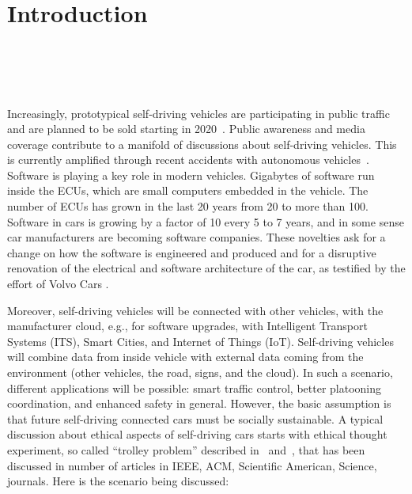 \section{Introduction}

\\
\\
\\
\\

Increasingly, prototypical self-driving vehicles are participating in public traffic~\cite{Persson2014} and are planned to be sold starting in 2020~\cite{Toyota2015,Stoll_WSJ_2016}. Public awareness and media coverage contribute to a manifold of discussions about self-driving vehicles. This is currently amplified through recent accidents with autonomous vehicles~\cite{Tesla2016_tragicloss,Dolgov2016}. Software is playing a key role in modern vehicles. Gigabytes of software run inside the \acp{ECU}, which are small computers embedded in the vehicle. The number of \acp{ECU} has grown in the last 20 years from 20 to more than 100. Software in cars is growing by a factor of 10 every 5 to 7 years, and in some sense car manufacturers are becoming software companies. These novelties ask for a change on how the software is engineered and produced and for a disruptive renovation of the electrical and software architecture of the car, as testified by the effort of Volvo Cars \cite{PELLICCIONE201783}.

Moreover, self-driving vehicles will be connected with other vehicles, with the manufacturer cloud, e.g., for software upgrades, with Intelligent Transport Systems (ITS), Smart Cities, and Internet of Things (IoT). Self-driving vehicles will combine data from inside vehicle with external data coming from the environment (other vehicles, the road, signs, and the cloud). In such a scenario, different applications will be possible: smart traffic control, better platooning coordination, and enhanced safety in general.
However, the basic assumption is that future self-driving connected cars must be socially sustainable.
A typical discussion about ethical aspects of self-driving cars starts with ethical thought experiment, so called \enquote{trolley problem} described in~\cite{Foot1967} and~\cite{Wintersberger2017}, that has been discussed in number of articles in IEEE, ACM, Scientific American, Science, \ugh{[31-38]} journals. Here is the scenario being discussed:


